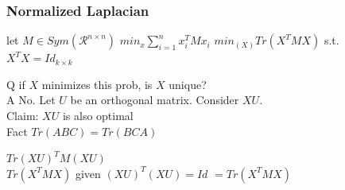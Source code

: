 {	\subsubsection{Normalized Laplacian}
	
	\begin{exercise}
		let $M \in Sym(\mathcal R^{n \times n})$
		$min_{x} \sum_{i=1}^{n} x_i^T M x_i$ $min_(X) Tr(X^T M X)$ s.t. $X^TX = Id_{k\times k}$ 
		
		Q if $X$ minimizes this prob, is $X$ unique?\\
		A No. Let $U$ be an orthogonal matrix.  Consider $XU$. \\
		Claim: $XU$ is also optimal\\
		
		Fact $Tr(ABC) = Tr(BCA)$ \\
		
		\begin{center}
			$Tr(XU)^T M (XU)$\\
			$ Tr(X^T M X)$ given $(XU)^T(XU) = Id$
			$=Tr(X^TMX)$
		\end{center}
		
	\end{exercise}
}

